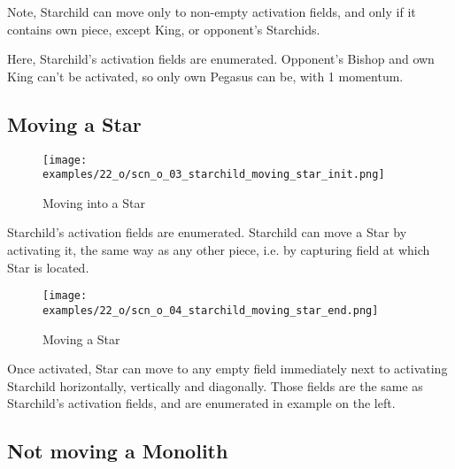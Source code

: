Note, Starchild can move only to non-empty activation fields, and only if it contains
own piece, except King, or opponent's Starchids.

Here, Starchild’s activation fields are enumerated. Opponent's Bishop and own King can't
be activated, so only own Pegasus can be, with 1 momentum.

\vspace*{-1.1\baselineskip}
\subsection*{Moving a Star}

\vspace*{-0.9\baselineskip}
\noindent
\begin{wrapfigure}[5]{l}{0.4\textwidth}
\centering
\texttt{[image: examples/22\_o/scn\_o\_03\_starchild\_moving\_star\_init.png]}
\caption{Moving into a Star}
\label{fig:scn_o_03_starchild_moving_star_init}
\end{wrapfigure}
Starchild's activation fields are enumerated. Starchild can move a Star by activating it,
the same way as any other piece, i.e. by capturing field at which Star is located.

\vspace*{2.1\baselineskip}
\noindent
\begin{wrapfigure}[9]{l}{0.4\textwidth}
\centering
\texttt{[image: examples/22\_o/scn\_o\_04\_starchild\_moving\_star\_end.png]}
\caption{Moving a Star}
\label{fig:scn_o_04_starchild_moving_star_end}
\end{wrapfigure}
Once activated, Star can move to any empty field immediately next to activating Starchild
horizontally, vertically and diagonally. Those fields are the same as Starchild's activation
fields, and are enumerated in example on the left.

\clearpage %

\subsection*{Not moving a Monolith}

